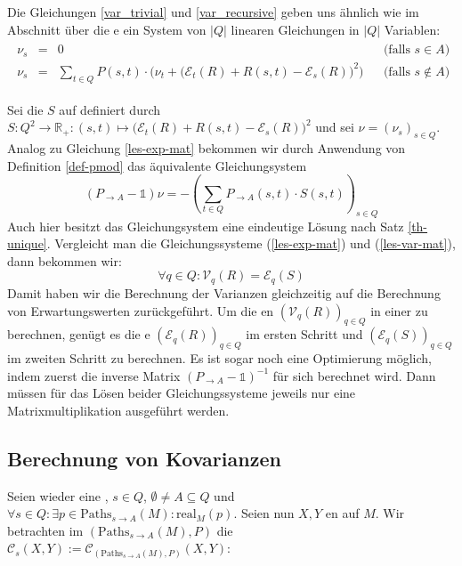 \documentclass[a4paper]{article}
\theoremstyle{nonumberplain}
\begin{document}
{Die Gleichungen \ref{var_trivial} und \ref{var_recursive} geben uns ähnlich wie im Abschnitt über die \expect{}e ein System von $|Q|$ linearen Gleichungen in $|Q|$ Variablen:
\begin{align}
\begin{aligned}
	\nu_s & = & 0 && \text{(falls $s \in A$)}\\
	\nu_s & = & \sum_{t \in Q}{ P(s,t) \cdot \Big(\nu_t + \big(\mathcal{E}_{t}(R) + R(s,t) - \mathcal{E}_{s}(R)\big)^2\Big) } && \text{(falls $s \notin A$)}
\end{aligned}\label{les-var}
\end{align}

Sei die \reward{} $S$ auf definiert durch $S: Q^2 \to \mathbb{R}_+ : (s,t) \mapsto \big(\mathcal{E}_{t}(R) + R(s,t) - \mathcal{E}_{s}(R)\big)^2$ und sei $\nu = (\nu_s)_{s\in Q}$. Analog zu Gleichung \ref{les-exp-mat} bekommen wir durch Anwendung von Definition \ref{def-pmod} das äquivalente Gleichungsystem
\begin{equation}
	(P_{\rightarrow A} - \mathbb{1}) \nu = - \left(\sum_{t \in Q}{ P_{\rightarrow A}(s,t) \cdot S(s,t) }\right)_{s \in Q}\label{les-var-mat}
\end{equation}
Auch hier besitzt das Gleichungsystem eine eindeutige Lösung nach Satz \ref{th-unique}. Vergleicht man die Gleichungssysteme (\ref{les-exp-mat}) und (\ref{les-var-mat}), dann bekommen wir:
\begin{equation}
\forall q \in Q : \mathcal{V}_q(R) = \mathcal{E}_q(S)
\end{equation}
Damit haben wir die Berechnung der Varianzen gleichzeitig auf die Berechnung von Erwartungswerten zurückgeführt. Um die \var{}en $(\mathcal{V}_q(R))_{q\in Q}$ in einer \mc{} zu berechnen, genügt es die \expect{}e $(\mathcal{E}_q(R))_{q\in Q}$ im ersten Schritt und $(\mathcal{E}_q(S))_{q\in Q}$ im zweiten Schritt zu berechnen. Es ist sogar noch eine Optimierung möglich, indem zuerst die inverse Matrix $(P_{\rightarrow A} - \mathbb{1})^{-1}$ für sich berechnet wird. Dann müssen für das Lösen beider Gleichungssysteme jeweils nur eine Matrixmultiplikation ausgeführt werden.

\subsection{Berechnung von Kovarianzen}
Seien wieder \mcex{} eine \mc{}, $s \in Q$, $\emptyset \neq A \subseteq Q$ und $\forall s \in Q: \exists p \in \mathrm{Paths}_{s \rightarrow A}(M) : \mathrm{real}_{M}(p)$. Seien nun $X, Y$ \reward{}en auf $M$. Wir betrachten im \probspace{} $(\mathrm{Paths}_{s \rightarrow A}(M), P)$ die \cov{} $\mathcal{C}_s(X,Y) := \mathcal{C}_{(\mathrm{Paths}_{s \rightarrow A}(M), P)}(X,Y)$:

}
\end{document}
